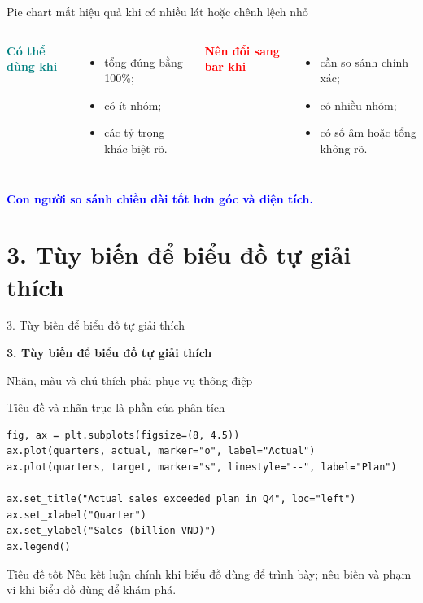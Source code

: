 \documentclass[aspectratio=169,12pt]{beamer}
\newcommand{\key}[1]{\textcolor{Blue}{\textbf{#1}}}
\newcommand{\good}[1]{\textcolor{Teal}{\textbf{#1}}}
\newcommand{\bad}[1]{\textcolor{Red}{\textbf{#1}}}
\newcommand{\SectionSlide}[2]{
\section{#1}
\begin{frame}{#1}
  \vfill
  \centering
  {\usebeamercolor[fg]{structure}\fontsize{24}{29}\selectfont\bfseries #1\par}
  \vspace{5mm}
  {\large #2\par}
  \vfill
\end{frame}}
\begin{document}
\begin{frame}{Pie chart mất hiệu quả khi có nhiều lát hoặc chênh lệch nhỏ}
\begin{columns}[T,onlytextwidth]
\good{Có thể dùng khi}
\begin{itemize}
  \item tổng đúng bằng 100\%;
  \item có ít nhóm;
  \item các tỷ trọng khác biệt rõ.
\end{itemize}
\bad{Nên đổi sang bar khi}
\begin{itemize}
  \item cần so sánh chính xác;
  \item có nhiều nhóm;
  \item có số âm hoặc tổng không rõ.
\end{itemize}
\end{columns}
\vspace{4mm}
\begin{center}\key{Con người so sánh chiều dài tốt hơn góc và diện tích.}\end{center}
\end{frame}

\SectionSlide{3. Tùy biến để biểu đồ tự giải thích}{Nhãn, màu và chú thích phải phục vụ thông điệp}

\begin{frame}[fragile]{Tiêu đề và nhãn trục là phần của phân tích}
\begin{lstlisting}[style=py]
fig, ax = plt.subplots(figsize=(8, 4.5))
ax.plot(quarters, actual, marker="o", label="Actual")
ax.plot(quarters, target, marker="s", linestyle="--", label="Plan")

ax.set_title("Actual sales exceeded plan in Q4", loc="left")
ax.set_xlabel("Quarter")
ax.set_ylabel("Sales (billion VND)")
ax.legend()
\end{lstlisting}
\vspace{2mm}
\begin{block}{Tiêu đề tốt}
Nêu kết luận chính khi biểu đồ dùng để trình bày; nêu biến và phạm vi khi biểu đồ dùng để khám phá.
\end{block}
\end{frame}
\end{document}
